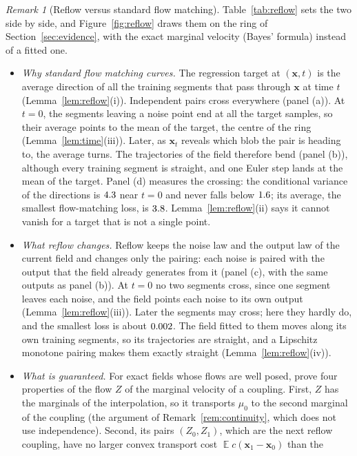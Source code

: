 \documentclass{article}
\DeclareMathOperator{\E}{\mathbb{E}}
\newcommand{\bx}{\mathbf{x}}
\theoremstyle{plain}
\theoremstyle{remark}
\newtheorem{remark}[theorem]{Remark}
\begin{document}
\begin{remark}[Reflow versus standard flow matching]\label{rem:reflow}
Table~\ref{tab:reflow} sets the two side by side, and Figure~\ref{fig:reflow} draws them on the ring of Section~\ref{sec:evidence}, with
the exact marginal velocity (Bayes' formula) instead of a fitted one.
\begin{itemize}
\item \emph{Why standard flow matching curves.} The regression target at $(\bx,t)$ is the average direction of all the
training segments that pass through $\bx$ at time $t$ (Lemma~\ref{lem:reflow}(i)). Independent pairs cross everywhere
(panel (a)). At $t=0$, the segments leaving a noise point end at all the target samples, so their average points to the
mean of the target, the centre of the ring (Lemma~\ref{lem:time}(iii)). Later, as $\bx_t$ reveals which blob the pair is heading
to, the average turns. The trajectories of the field therefore bend (panel (b)), although every training segment is
straight, and one Euler step lands at the mean of the target. Panel (d) measures the crossing: the conditional
variance of the directions is $4.3$ near $t=0$ and never falls below $1.6$; its average, the smallest flow-matching loss,
is $3.8$. Lemma~\ref{lem:reflow}(ii) says it cannot vanish for a target that is not a single point.
\item \emph{What reflow changes.} Reflow keeps the noise law and the output law of the current field and changes only
the pairing: each noise is paired with the output that the field already generates from it (panel (c), with the same
outputs as panel (b)). At $t=0$ no two segments cross, since one segment leaves each noise, and the field points each
noise to its own output (Lemma~\ref{lem:reflow}(iii)). Later the segments may cross; here they hardly do, and the smallest
loss is about $0.002$. The field fitted to them moves along its own training segments, so its trajectories are straight,
and a Lipschitz monotone pairing makes them exactly straight (Lemma~\ref{lem:reflow}(iv)).
\item \emph{What is guaranteed.} For exact fields whose flows are well posed, \citet{liu2023flow} prove four properties of
the flow $Z$ of the marginal velocity of a coupling. First, $Z$ has the marginals of the interpolation, so it transports
$\mu_0$ to the second marginal of the coupling (the argument of Remark~\ref{rem:continuity}, which does not use independence).
Second, its pairs $(Z_0,Z_1)$, which are the next reflow coupling, have no larger convex transport cost $\E c(\bx_1-\bx_0)$ than the

\end{itemize}
\end{remark}
\end{document}
